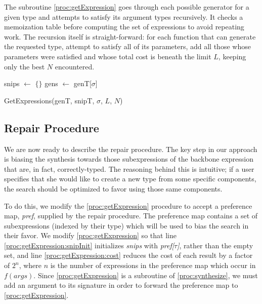 The subroutine \ref{proc:getExpression} goes through each possible generator for a given type and attempts to satisfy its argument types recursively. It checks a memoization table before computing the set of expressions to avoid repeating work. The recursion itself is straight-forward: for each function that can generate the requested type, attempt to satisfy all of its parameters, add all those whose parameters were satisfied and whose total cost is beneath the limit $L$, keeping only the best $N$ encountered.
\begin{procedure}
snips $\leftarrow$ $\{\}$ \; \label{proc:getExpression:snipInit}
gens $\leftarrow$ genT[$\sigma$] \;
\caption{GetExpressions(genT, snipT, $\sigma$, $L$, $N$)}\label{proc:getExpression}
\end{procedure}

\subsection{Repair Procedure}
We are now ready to describe the repair procedure. The key step in our approach is biasing the synthesis towards those subexpressions of the backbone expression that are, in fact, correctly-typed. The reasoning behind this is intuitive; if a user specifies that she would like to create a new type from some specific components, the search should be optimized to favor using those same components.

To do this, we modify the \ref{proc:getExpression} procedure to accept a preference map, \textit{pref}, supplied by the repair procedure. The preference map contains a set of subexpressions (indexed by their type) which will be used to bias the search in their favor. We modify \ref{proc:getExpression} so that line \ref{proc:getExpression:snipInit} initializes \textit{snips} with \textit{pref[$\tau$]}, rather than the empty set, and line \ref{proc:getExpression:cost} reduces the cost of each result by a factor of $2^{n}$, where $n$ is the number of expressions in the preference map which occur in $f(args)$. Since \ref{proc:getExpression} is a subroutine of \ref{proc:synthesize}, we must add an argument to its signature in order to forward the preference map to \ref{proc:getExpression}.

